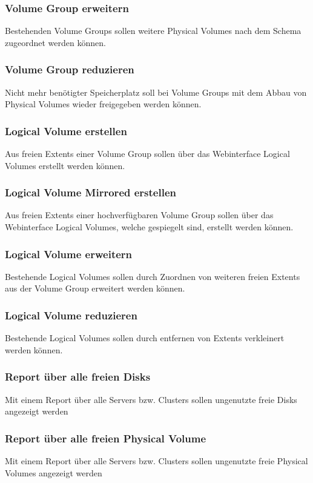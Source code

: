 \subsubsection{Volume Group erweitern}
Bestehenden Volume Groups sollen weitere Physical Volumes nach dem Schema zugeordnet werden können.

\subsubsection{Volume Group reduzieren}
Nicht mehr benötigter Speicherplatz soll bei Volume Groups mit dem Abbau von Physical Volumes wieder freigegeben werden können.

\subsubsection{Logical Volume erstellen}
Aus freien Extents einer Volume Group sollen über das Webinterface Logical Volumes erstellt werden können.

\subsubsection{Logical Volume Mirrored erstellen}
Aus freien Extents einer hochverfügbaren Volume Group sollen über das Webinterface Logical Volumes, welche gespiegelt sind, erstellt werden können.

\subsubsection{Logical Volume erweitern}
Bestehende Logical Volumes sollen durch Zuordnen von weiteren freien Extents aus der Volume Group erweitert werden können.

\subsubsection{Logical Volume reduzieren}
Bestehende Logical Volumes sollen durch entfernen von Extents verkleinert werden können.

\subsubsection{Report über alle freien Disks}
Mit einem Report über alle Servers bzw. Clusters sollen ungenutzte freie Disks angezeigt werden

\subsubsection{Report über alle freien Physical Volume}
Mit einem Report über alle Servers bzw. Clusters sollen ungenutzte freie Physical Volumes angezeigt werden

